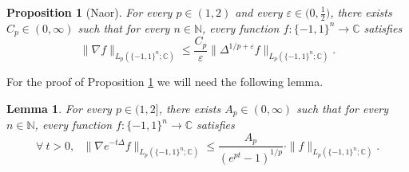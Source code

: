 \documentclass[11pt,reqno]{amsart}
\renewcommand{\leq}{\leqslant}
\newcommand{\e}{\varepsilon}
\newcommand{\1}{\mathbf 1}
\newtheorem{lemma}[theorem]{Lemma}
\newtheorem{proposition}[theorem]{Proposition}
\theoremstyle{remark}
\newcommand{\C}{\mathbb C}
\newcommand{\N}{\mathbb N}
\begin{document}
\begin{proposition} [Naor] \label{prop:naor}
For every $p\in(1,2)$ and every $\e\in\big(0,\frac{1}{2}\big)$, there exists $C_p\in(0,\infty)$ such that for every $n\in\N$, every function $f:\{-1,1\}^n\to\C$ satisfies
\begin{equation} \label{eq:naor}
\|\nabla f\|_{L_p(\{-1,1\}^n;\C)}\leq \frac{C_p}{\e} \|\Delta^{1/p+\e}f\|_{L_p(\{-1,1\}^n;\C)}.
\end{equation}
\end{proposition}

For the proof of Proposition \ref{prop:naor} we will need the following lemma.

\begin{lemma} \label{lem:naor}
For every $p\in(1,2]$, there exists $A_p\in(0,\infty)$ such that for every $n\in\N$, every function $f:\{-1,1\}^n\to\C$ satisfies
\begin{equation} \label{eq:naor2}
\forall \ t>0, \ \ \ \| \nabla e^{-t\Delta} f\|_{L_p(\{-1,1\}^n;\C)} \leq \frac{A_p}{(e^{pt}-1)^{1/p}}\cdot \|f\|_{L_p(\{-1,1\}^n;\C)}.
\end{equation}
\end{lemma}
\end{document}
